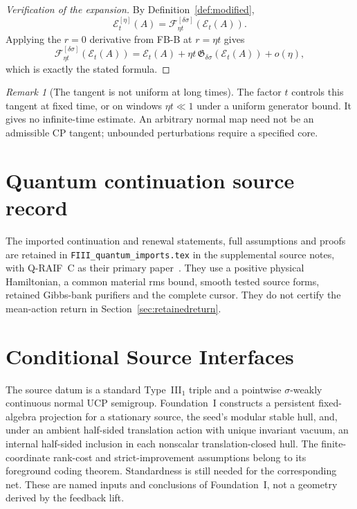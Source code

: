 \documentclass[12pt]{article}
\theoremstyle{definition}
\theoremstyle{remark}
\newtheorem{remark}[theorem]{Remark}
\begin{document}
\begin{proof}[Verification of the expansion]
By Definition~\ref{def:modified},
\[
\mathcal E_t^{[\eta]}(A)
=
\mathscr F_{\eta t}^{[\delta\sigma]}(\mathcal E_t(A)).
\]
Applying the \(r=0\) derivative from FB-B at \(r=\eta t\) gives
\[
\mathscr F_{\eta t}^{[\delta\sigma]}(\mathcal E_t(A))
=
\mathcal E_t(A)
+
\eta t\,\mathfrak G_{\delta\sigma}(\mathcal E_t(A))
+
o(\eta),
\]
which is exactly the stated formula.
\end{proof}

\begin{remark}[The tangent is not uniform at long times]
The factor \(t\) controls this tangent at fixed time, or on windows
\(\eta t\ll1\) under a uniform generator bound. It gives no
infinite-time estimate. An arbitrary normal map need not be an
admissible CP tangent; unbounded perturbations require a specified core.
\end{remark}

\section{Quantum continuation source record}\label{app:quantum_imports}
The imported continuation and renewal statements, full assumptions and
proofs are retained in \texttt{FIII\_quantum\_imports.tex} in the supplemental
source notes, with Q-RAIF~C as their primary paper~\cite{QRAIFC}.
They use a positive physical Hamiltonian, a common material rms bound,
smooth tested source forms, retained Gibbs-bank purifiers and the
complete cursor. They do not certify the mean-action return in
Section~\ref{sec:retainedreturn}.

\section{Conditional Source Interfaces}\label{app:interfaces}

The source datum is a standard Type~III$_1$ triple and a pointwise
$\sigma$-weakly continuous normal UCP semigroup. Foundation~I
constructs a persistent fixed-algebra projection for a stationary
source, the seed's modular stable hull, and, under an ambient
half-sided translation action with unique invariant vacuum, an
internal half-sided inclusion in each nonscalar translation-closed
hull. The finite-coordinate rank-cost and strict-improvement assumptions
belong to its foreground coding theorem. Standardness is still needed
for the corresponding net. These are named inputs and conclusions of
Foundation~I, not a geometry derived by the feedback lift.
\end{document}
